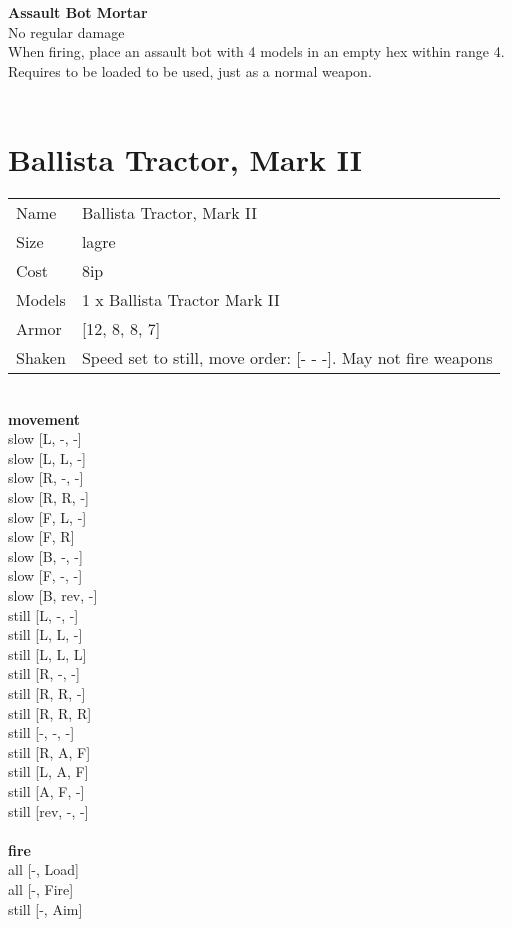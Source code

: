 {\bf Assault Bot Mortar } \\

No regular damage\\ 
When firing, place an assault bot with 4 models in an empty hex within range 4. Requires to be loaded to be used, just as a normal weapon.\\ 





 
\ \\













\clearpage

\section{ Ballista Tractor, Mark II }

\begin{tabular}{ll}
  Name & Ballista Tractor, Mark II \\
  Size & lagre\\
  Cost & 8ip\\
  Models & 1 x Ballista Tractor Mark II\\
  Armor & [12, 8, 8, 7]\\
  Shaken & Speed set to still, move order: [- - -]. May not fire weapons\\
\end{tabular}

\noindent 

\ \\ {\bf movement } \\
slow [L, -, -] \\
slow [L, L, -] \\
slow [R, -, -] \\
slow [R, R, -] \\
slow [F, L, -] \\
slow [F, R] \\
slow [B, -, -] \\
slow [F, -, -] \\
slow [B, rev, -] \\
still [L, -, -] \\
still [L, L, -] \\
still [L, L, L] \\
still [R, -, -] \\
still [R, R, -] \\
still [R, R, R] \\
still [-, -, -] \\
still [R, A, F] \\
still [L, A, F] \\
still [A, F, -] \\
still [rev, -, -] \\
\ \\ {\bf fire } \\
all [-, Load] \\
all [-, Fire] \\
still [-, Aim] \\


